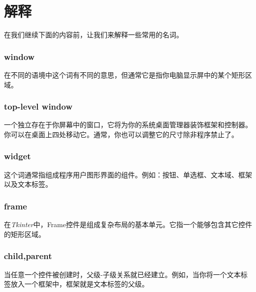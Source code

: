 \chapter[解释]{解释}
在我们继续下面的内容前，让我们来解释一些常用的名词。
\subsection*{window}
\indent
在不同的语境中这个词有不同的意思，但通常它是指你电脑显示屏中的某个矩形区域。
\subsection*{top-level window}
\indent
一个独立存在于你屏幕中的窗口，它将为你的系统桌面管理器装饰框架和控制器。你可以在桌面上四处移动它。通常，你也可以调整它的尺寸除非程序禁止了。
\subsection*{widget}
\indent
这个词通常指组成程序用户图形界面的组件。例如：按钮、单选框、文本域、框架以及文本标签。
\subsection*{frame}
\indent
在\textit{Tkinter}中，Frame控件是组成复杂布局的基本单元。它指一个能够包含其它控件的矩形区域。
\subsection*{child,parent}
\indent
当任意一个控件被创建时，父级-子级关系就已经建立。例如，当你将一个文本标签放入一个框架中，框架就是文本标签的父级。
